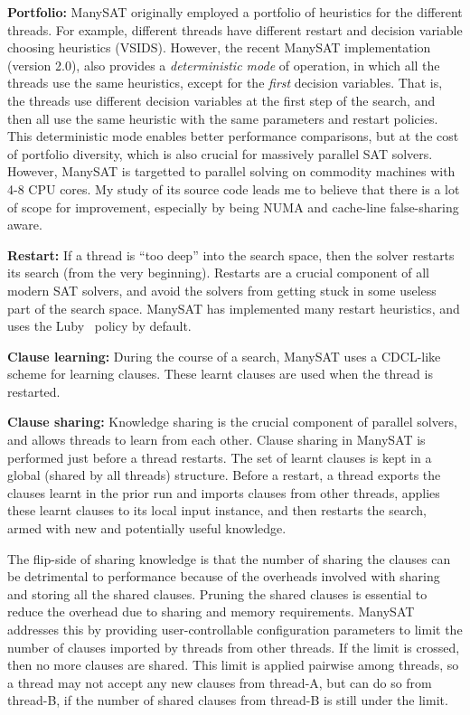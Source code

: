 \documentclass{article}
\begin{document}
\textbf{Portfolio: } ManySAT originally employed a portfolio of
heuristics for the different threads. For example, different threads
have different restart and decision variable choosing heuristics
(VSIDS). However, the recent ManySAT implementation (version 2.0),
also provides a \emph{deterministic mode} of operation, in which all
the threads use the same heuristics, except for the \emph{first}
decision variables. That is, the threads use different decision
variables at the first step of the search, and then all use the same
heuristic with the same parameters and restart policies. This
deterministic mode enables better performance comparisons, but at the
cost of portfolio diversity, which is also crucial for massively
parallel SAT solvers. However, ManySAT is targetted to parallel
solving on commodity machines with 4-8 CPU cores. My study of its
source code leads me to believe that there is a lot of scope for
improvement, especially by being NUMA and cache-line false-sharing
aware.


\textbf{Restart: } If a thread is ``too deep'' into the search space,
then the solver restarts its search (from the very
beginning). Restarts are a crucial component of all modern SAT
solvers, and avoid the solvers from getting stuck in some useless part
of the search space. ManySAT has implemented many restart heuristics,
and uses the Luby~\cite{luby} policy by default.

\textbf{Clause learning: } During the course of a search, ManySAT uses
a CDCL-like scheme for learning clauses. These learnt clauses are used
when the thread is restarted.

\textbf{Clause sharing: } Knowledge sharing is the crucial component
of parallel solvers, and allows threads to learn from each
other. Clause sharing in ManySAT is performed just before a thread
restarts. The set of learnt clauses is kept in a global (shared by all
threads) structure. Before a restart, a thread exports the clauses
learnt in the prior run and imports clauses from other threads,
applies these learnt clauses to its local input instance, and then
restarts the search, armed with new and potentially useful
knowledge. 

The flip-side of sharing knowledge is that the number of sharing the
clauses can be detrimental to performance because of the overheads
involved with sharing and storing all the shared clauses. Pruning the
shared clauses is essential to reduce the overhead due to sharing and
memory requirements. ManySAT addresses this by providing
user-controllable configuration parameters to limit the number of
clauses imported by threads from other threads. If the limit is
crossed, then no more clauses are shared. This limit is applied
pairwise among threads, so a thread may not accept any new clauses
from thread-A, but can do so from thread-B, if the number of shared
clauses from thread-B is still under the limit.
\end{document}
